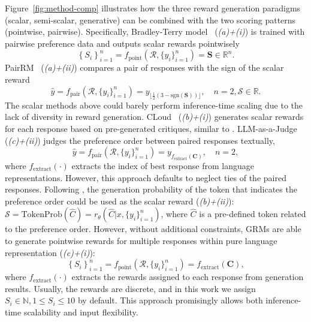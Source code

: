 \documentclass{article} %
\begin{document}
Figure~\ref{fig:method-comp} illustrates how the three reward generation paradigms (scalar, semi-scalar, generative) can be combined with the two scoring patterns (pointwise, pairwise). Specifically, Bradley-Terry model~\citep{0627eaad-0ecb-353b-9c3d-81e29de3658f} (\emph{(a)+(i)}) is trained with pairwise preference data and outputs scalar rewards pointwisely 
\begin{equation}\label{eq:inf-scalar-pointwise}
\left\{ S_i \right\}_{i=1}^n = f_{\mathrm{point}}\left(\mathcal{R}, \{y_i\}_{i=1}^n\right) = \boldsymbol{S} \in \mathbb{R}^n. 
\end{equation}
PairRM~\citep{jiang-etal-2023-llm} (\emph{(a)+(ii)}) compares a pair of responses with the sign of the scalar reward 
\begin{equation}
\hat{y} = f_{\mathrm{pair}}\left(\mathcal{R}, \{y_i\}_{i=1}^n\right) = y_{\lfloor\frac{1}{2} (3-\mathrm{sgn}(\boldsymbol{S}))\rfloor}, \quad n=2, \mathcal{S} \in \mathbb{R}.
\end{equation}
The scalar methods above could barely perform inference-time scaling due to the lack of diversity in reward generation. 
CLoud~\citep{ankner2024critiqueoutloudrewardmodels} (\emph{(b)+(i)}) generates scalar rewards for each response based on pre-generated critiques, similar to . 
LLM-as-a-Judge~\citep{chatbot-arena} (\emph{(c)+(ii)}) judges the preference order between paired responses textually, 
\begin{equation}
  \hat{y} = f_{\mathrm{pair}}\left(\mathcal{R}, \{y_i\}_{i=1}^n\right) = y_{f_{\mathrm{extract}}(\boldsymbol{C})}, \quad n=2, 
\end{equation}
where $f_{\mathrm{extract}}(\cdot)$ extracts the index of best response from language representations. However, this approach defaults to neglect ties of the paired responses. Following \citet{zhang2025generative}, the generation probability of the token that indicates the preference order could be used as the scalar reward (\emph{(b)+(ii)}): $\mathcal{S} = \mathrm{TokenProb}(\hat{C})=r_{\theta}(\hat{C} \vert x, \{y_i\}_{i=1}^n)$, where $\hat{C}$ is a pre-defined token related to the preference order.  
However, without additional constraints, GRMs are able to generate pointwise rewards for multiple responses within pure language representation (\emph{(c)+(i)}):  
\begin{equation}
  \left\{ S_i \right\}_{i=1}^n = f_{\mathrm{point}}\left(\mathcal{R}, \{y_i\}_{i=1}^n\right) = f_{\mathrm{extract}}(\boldsymbol{C}), 
\end{equation}
where $f_{\mathrm{extract}}(\cdot)$ extracts the rewards assigned to each response from generation results. Usually, the rewards are discrete, and in this work we assign $S_i \in \mathbb{N}, 1 \leq S_i \leq 10$ by default. This approach promisingly allows both inference-time scalability and input flexibility.
\end{document}
